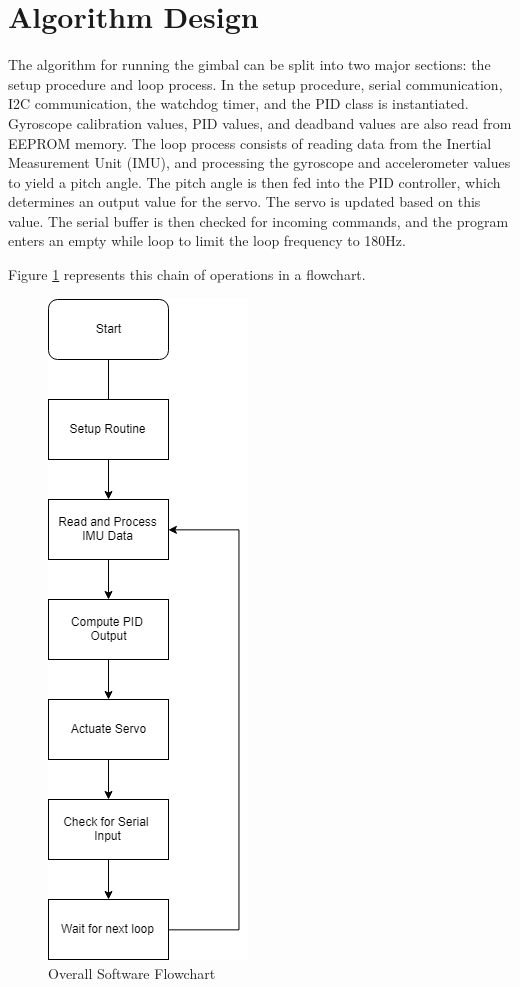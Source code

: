 \documentclass[11pt]{article} %
\begin{document}
\newpage
\section{Algorithm Design}

The algorithm for running the gimbal can be split into two major sections: the setup procedure and loop process. In the setup procedure, serial communication, I2C communication, the watchdog timer, and the PID class is instantiated. Gyroscope calibration values, PID values, and deadband values are also read from EEPROM memory. The loop process consists of reading data from the Inertial Measurement Unit (IMU), and processing the gyroscope and accelerometer values to yield a pitch angle. The pitch angle is then fed into the PID controller, which determines an output value for the servo. The servo is updated based on this value. The serial buffer is then checked for incoming commands, and the program enters an empty while loop to limit the loop frequency to 180Hz. 

Figure \ref{fig:software_flowchart} represents this chain of operations in a flowchart. 

\begin{figure}[H]
\begin{centering}
\includegraphics[height = 0.9\textheight]{Pictures/software_flowchart.png}
\caption{Overall Software Flowchart}
\label{fig:software_flowchart}
\end{centering}
\end{figure}
\end{document}
